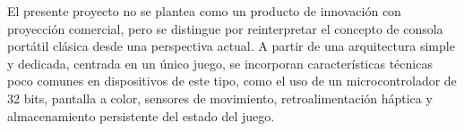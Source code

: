 \documentclass[
11pt, %
]{charter}
\begin{document}
\vspace{25px}

El presente proyecto no se plantea como un producto de innovación con proyección comercial, pero se distingue por reinterpretar el concepto de consola portátil clásica desde una perspectiva actual. A partir de una arquitectura simple y dedicada, centrada en un único juego, se incorporan características técnicas poco comunes en dispositivos de este tipo, como el uso de un microcontrolador de 32 bits, pantalla a color, sensores de movimiento, retroalimentación háptica y almacenamiento persistente del estado del juego.






\end{document}
